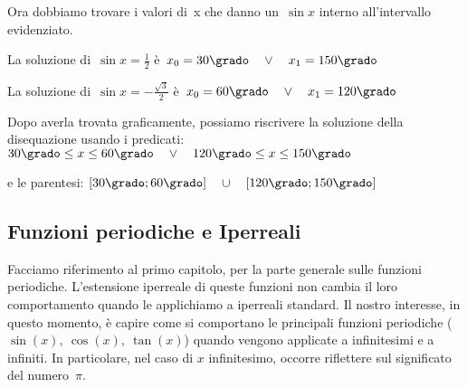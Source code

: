 \begin{esempio}
  Ora dobbiamo trovare i valori di~x che danno un~\(\sin x\) interno 
  all'intervallo evidenziato.
  
  La soluzione di~\(\sin x = \frac{1}{2}\) \quad
  è~\quad \(x_0 = 30 \grado \quad \vee \quad x_1 = 150 \grado\)
  
  La soluzione di~\(\sin x = -\frac{\sqrt{3}}{2}\) \quad
  è~\quad \(x_0 = 60 \grado \quad \vee \quad x_1 = 120 \grado\)
  
 \vspace{-6pt}
  \begin{center}
\begin{inaccessibleblock}
    
\end{inaccessibleblock}
  \end{center}

Dopo averla trovata graficamente, possiamo riscrivere la soluzione della 
disequazione usando i predicati:\quad 
\(30\grado \le x \le 60\grado \quad \vee \quad 
 120\grado \le x \le 150\grado\)

e le parentesi:\quad 
\(\left[30\grado ; 60\grado \right] \quad \cup \quad
 \left[120\grado ; 150\grado \right]\)
  
 \end{esempio}

\subsection{Funzioni periodiche e Iperreali}
\label{subsubsec:insnum_periodiche}
Facciamo riferimento al primo capitolo, per la parte generale 
sulle funzioni periodiche. L'estensione iperreale di queste funzioni
non cambia il loro comportamento quando le applichiamo a iperreali standard.
Il nostro interesse, in questo momento, è capire come si comportano
le principali funzioni periodiche (\(\sin(x),\ \cos(x),\ \tan(x)\))
quando vengono applicate a infinitesimi e a infiniti. In particolare,
nel caso di \(x\) infinitesimo, occorre riflettere sul significato del
numero~\(\pi\).

